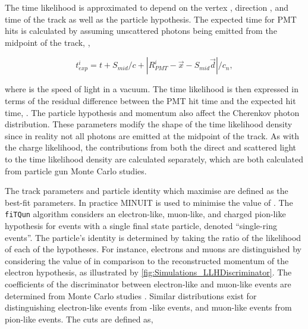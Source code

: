 The time likelihood is approximated to depend on the vertex , direction , and time  of the track as well as the particle hypothesis. The expected time for PMT hits is calculated by assuming unscattered photons being emitted from the midpoint of the track, ,

\begin{equation}
  t_{exp}^{i} = t + S_{mid}/c + |R_{PMT}^{i} - \vec{x} - S_{mid}\vec{d}|/c_{n},
\end{equation}

where  is the speed of light in a vacuum. The time likelihood is then expressed in terms of the residual difference between the PMT hit time and the expected hit time, .
The particle hypothesis and momentum also affect the Cherenkov photon distribution. These parameters modify the shape of the time likelihood density since in reality not all photons are emitted at the midpoint of the track. As with the charge likelihood, the contributions from both the direct and scattered light to the time likelihood density are calculated separately, which are both calculated from particle gun Monte Carlo studies.

The track parameters and particle identity which maximise  are defined as the best-fit parameters. In practice MINUIT \cite{James:2296388} is used to minimise the value of . The \texttt{fiTQun} algorithm considers an electron-like, muon-like, and charged pion-like hypothesis for events with a single final state particle, denoted ``single-ring events''. The particle's identity is determined by taking the ratio of the likelihood of each of the hypotheses. For instance, electrons and muons are distinguished by considering the value of  in comparison to the reconstructed momentum of the electron hypothesis, as illustrated by \autoref{fig:Simulations_LLHDiscriminator}. The coefficients of the discriminator between electron-like and muon-like events are determined from Monte Carlo studies \cite{t2k_tn_146}. Similar distributions exist for distinguishing electron-like events from -like events, and muon-like events from pion-like events. The cuts are defined as,

